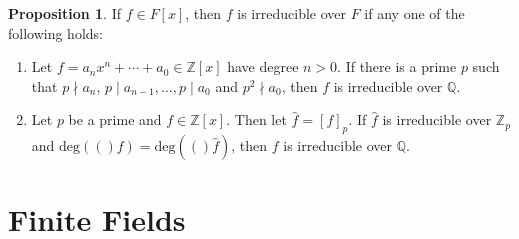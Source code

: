 \documentclass{article}
\makeatletter
\newcommand{\deg}[1]{\text{deg}(#1)}
\theoremstyle{definition}
\newtheorem{prop}{Proposition}[section]
\theoremstyle{remark}
\let\oldproofname=\proofname
\renewcommand{\proofname}{\textit{\oldproofname}}
\theoremstyle{definition}
\renewenvironment{proof}[1][\proofname]{\par
  \pushQED{\qed}%
  \normalfont \topsep6\p@\@plus6\p@\relax
  \list{}{\leftmargin=0mm
          \rightmargin=0mm
          \settowidth{\itemindent}{\itshape#1}%
          \labelwidth=\itemindent
          \parsep=0pt \listparindent=0mm%
  }
  \item[\hskip\labelsep
        \itshape
    #1\@addpunct{.}]\ignorespaces
}{%
  \popQED\endlist\@endpefalse
}
\makeatother
\begin{document}
        \begin{proof}
        
        \end{proof}
    \begin{prop}
        If $f\in F[x]$, then $f$ is irreducible over $F$ if any one of the following holds:
            \begin{enumerate}
                \item Let $f=a_nx^n+\cdots+a_0\in\mathbb{Z}[x]$ have degree $n>0$. If there is a prime $p$ such that $p\nmid a_n$, $p\mid a_{n-1},\dots,p\mid a_0$ and $p^2\nmid a_0$, then $f$ is irreducible over $\mathbb{Q}$.
                \item Let $p$ be a prime and $f\in\mathbb{Z}[x]$. Then let $\hat{f}=[f]_p$. If $\hat{f}$ is irreducible over $\mathbb{Z}_p$ and $\deg(f)=\deg(\hat{f})$, then $f$ is irreducible over $\mathbb{Q}$.
            \end{enumerate}
    \end{prop}
\section{Finite Fields}
    
\end{document}
